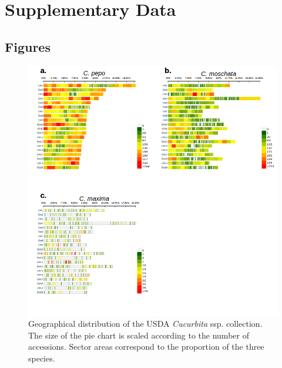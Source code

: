 \documentclass[utf8]{frontiers_suppmat} %
\begin{document}
\onecolumn
{}

\title {{}}


\maketitle


\section{Supplementary Data}



\subsection{Figures}


\begin{figure}[h]
	\begin{center}
		\includegraphics[width=\textwidth]{../supplemental/02_fig.png}
	\end{center}
	\caption{Geographical distribution of the USDA \textit{Cucurbita} ssp. collection. The size of the pie chart is scaled according to the number of accessions. Sector areas correspond to the proportion of the three species. \label{fig:1}}
\end{figure}
\end{document}
